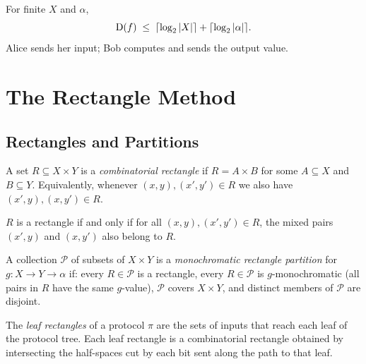 \begin{theorem}
  \label{thm:det_cc_le_clog_X_alpha}
  \leanok
  For finite $X$ and $\alpha$,
  \[
    \mathrm{D}(f) \;\le\; \lceil \log_2 |X| \rceil + \lceil \log_2 |\alpha| \rceil.
  \]
  Alice sends her input; Bob computes and sends the output value.
\end{theorem}

\chapter{The Rectangle Method}

\section{Rectangles and Partitions}

\begin{definition}[Rectangle]
  \label{def:rectangle}
  \leanok
  A set $R \subseteq X \times Y$ is a \emph{combinatorial rectangle} if
  $R = A \times B$ for some $A \subseteq X$ and $B \subseteq Y$.
  Equivalently, whenever $(x,y),(x',y') \in R$ we also have $(x',y),(x,y') \in R$.
\end{definition}

\begin{lemma}
  \label{lem:rectangle_iff}
  \leanok
  $R$ is a rectangle if and only if for all $(x,y),(x',y') \in R$,
  the mixed pairs $(x',y)$ and $(x,y')$ also belong to $R$.
\end{lemma}

\begin{definition}
  \label{def:mono_rect_partition}
  \leanok
  A collection $\mathcal{P}$ of subsets of $X \times Y$ is a
  \emph{monochromatic rectangle partition} for $g : X \to Y \to \alpha$ if:
  every $R \in \mathcal{P}$ is a rectangle, every $R \in \mathcal{P}$ is
  $g$-monochromatic (all pairs in $R$ have the same $g$-value), $\mathcal{P}$
  covers $X \times Y$, and distinct members of $\mathcal{P}$ are disjoint.
\end{definition}

\begin{definition}
  \label{def:leaf_rectangles}
  \leanok
  The \emph{leaf rectangles} of a protocol $\pi$ are the sets of inputs that
  reach each leaf of the protocol tree.  Each leaf rectangle is a combinatorial
  rectangle obtained by intersecting the half-spaces cut by each bit sent along
  the path to that leaf.
\end{definition}

